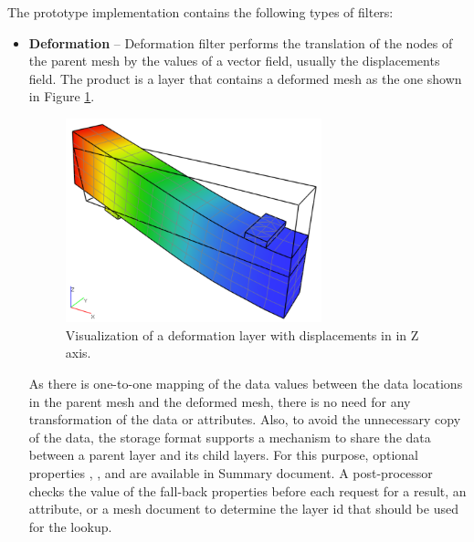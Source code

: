 The prototype implementation contains the following types of filters:


\begin{itemize}

    \item \textbf{Deformation} -- Deformation filter performs the translation of the nodes of the parent mesh by the values of a vector field, usually the displacements field. The product is a layer that contains a deformed mesh as the one shown in Figure \ref{fig:beam-deformation-layer}.

    \begin{figure}[H]
        \centering
        \includegraphics[width=0.7\textwidth]{figures/chapter-data-management/beam-deformation-layer}
        \decoRule
        \caption[Visualization of a deformation layer]{Visualization of a deformation layer with displacements in in Z axis.}
        \label{fig:beam-deformation-layer}
    \end{figure}
    
    As there is one-to-one mapping of the data values between the data locations in the parent mesh and the deformed mesh, there is no need for any transformation of the data or attributes. Also, to avoid the unnecessary copy of the data, the storage format supports a mechanism to share the data between a parent layer and its child layers. For this purpose, optional properties , , and  are available in Summary document. A post-processor checks the value of the fall-back properties before each request for a result, an attribute, or a mesh document to determine the layer id that should be used for the lookup.
    

\end{itemize}

